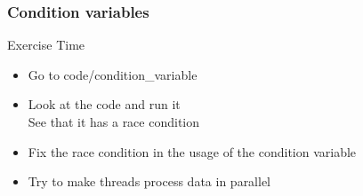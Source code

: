 \begin{frame}[fragile]
  \frametitle{Condition variables}
  \begin{alertblock}{Exercise Time}
    \begin{itemize}
    \item Go to code/condition\_variable
    \item Look at the code and run it\\
      See that it has a race condition
    \item Fix the race condition in the usage of the condition variable
    \item Try to make threads process data in parallel
    \end{itemize}
  \end{alertblock}
\end{frame}
